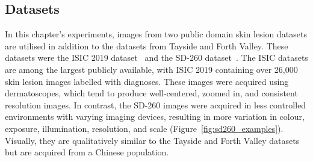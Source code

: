 \subsection{Datasets}
\label{subsec:generalisation_datasets}
In this chapter's experiments, images from two public domain skin lesion datasets are utilised in addition to the datasets from Tayside and Forth Valley. These datasets were the ISIC 2019 dataset~\citep{codella2018skin,combalia2019bcn20000,tschandl2018ham10000} and the SD-260 dataset~\citep{yang2019self}. The ISIC datasets are among the largest publicly available, with ISIC 2019 containing over 26,000 skin lesion images labelled with diagnoses. These images were acquired using dermatoscopes, which tend to produce well-centered, zoomed in, and consistent resolution images. In contrast, the SD-260 images were acquired in less controlled environments with varying imaging devices, resulting in more variation in colour, exposure, illumination, resolution, and scale (Figure~\ref{fig:sd260_examples}). Visually, they are qualitatively similar to the Tayside and Forth Valley datasets but are acquired from a Chinese population.


